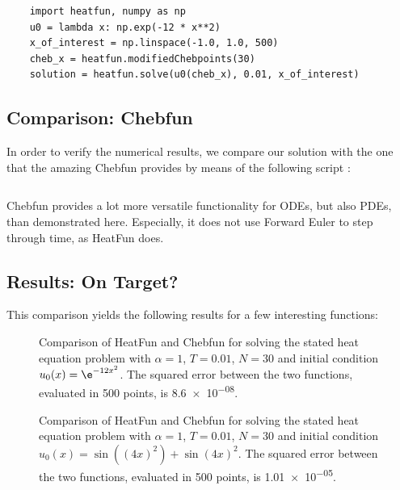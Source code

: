 \documentclass[12pt, a4paper]{article}
\begin{document}
  \begin{verbatim}
    import heatfun, numpy as np
    u0 = lambda x: np.exp(-12 * x**2)
    x_of_interest = np.linspace(-1.0, 1.0, 500)
    cheb_x = heatfun.modifiedChebpoints(30)
    solution = heatfun.solve(u0(cheb_x), 0.01, x_of_interest)
  \end{verbatim}

  \subsection{Comparison: Chebfun}
  In order to verify the numerical results, we compare our solution with the one that the amazing Chebfun provides by means of the following script \parencite{exploring}:
  \inputminted{matlab}{../analysis/heatfun.m}

  Chebfun provides a lot more versatile functionality for ODEs, but also PDEs, than demonstrated here.
  Especially, it does not use Forward Euler to step through time, as HeatFun does.


  \pagebreak
  \subsection{Results: On Target?}
  This comparison yields the following results for a few interesting functions:

  \begin{figure}[H]
    \centering
    \caption{Comparison of HeatFun and Chebfun for solving the stated heat equation problem with $\alpha = 1$, $T = 0.01$, $N = 30$ and initial condition $u_0(x) = \e^{-12 x^2}$. The squared error between the two functions, evaluated in 500 points, is \num{8.6e-08}.}
  \end{figure}

  \begin{figure}[H]
    \centering
    \caption{Comparison of HeatFun and Chebfun for solving the stated heat equation problem with $\alpha = 1$, $T = 0.01$, $N = 30$ and initial condition $u_0(x) = \sin((4x)^2) + \sin(4x)^2$. The squared error between the two functions, evaluated in 500 points, is \num{1.01e-05}.}
  \end{figure}
\end{document}
